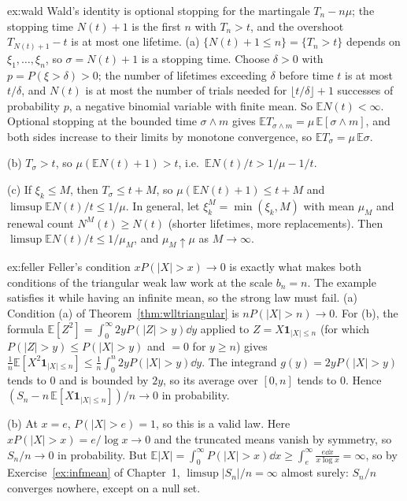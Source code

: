 \begin{solution}{ex:wald}
\idea Wald's identity is optional stopping for the martingale $T_n-n\mu$; the stopping time $N(t)+1$ is the first $n$ with $T_n>t$, and the overshoot
$T_{N(t)+1}-t$ is at most one lifetime.
\writeup (a) $\{N(t)+1\le n\}=\{T_n>t\}$ depends on $\xi_1,\dots,\xi_n$, so $\sigma=N(t)+1$ is a stopping time. Choose $\delta>0$ with $p=P(\xi>\delta)>0$; the
number of lifetimes exceeding $\delta$ before time $t$ is at most $t/\delta$, and $N(t)$ is at most the number of trials needed for $\lfloor t/\delta\rfloor+1$
successes of probability $p$, a negative binomial variable with finite mean. So $\mathbb E N(t)<\infty$. Optional stopping at the bounded time $\sigma\wedge m$ gives
$\mathbb E T_{\sigma\wedge m}=\mu\,\mathbb E[\sigma\wedge m]$, and both sides increase to their limits by monotone convergence, so $\mathbb E T_\sigma=\mu\,\mathbb E\sigma$.

(b) $T_\sigma>t$, so $\mu(\mathbb E N(t)+1)>t$, i.e.\ $\mathbb E N(t)/t>1/\mu-1/t$.

(c) If $\xi_k\le M$, then $T_\sigma\le t+M$, so $\mu(\mathbb E N(t)+1)\le t+M$ and $\limsup\mathbb E N(t)/t\le1/\mu$. In general, let $\xi_k^M=\min(\xi_k,M)$ with mean
$\mu_M$ and renewal count $N^M(t)\ge N(t)$ (shorter lifetimes, more replacements). Then $\limsup\mathbb E N(t)/t\le1/\mu_M$, and $\mu_M\uparrow\mu$ as $M\to\infty$.
\end{solution}

\begin{solution}{ex:feller}
\idea Feller's condition $xP(|X|>x)\to0$ is exactly what makes both conditions of the triangular weak law work at the scale $b_n=n$. The example
satisfies it while having an infinite mean, so the strong law must fail.
\writeup (a) Condition (a) of Theorem~\ref{thm:wlltriangular} is $nP(|X|>n)\to0$. For (b), the formula $\mathbb E[Z^2]=\int_0^\infty2yP(|Z|>y)\dd y$ applied to
$Z=X\mathbf 1_{|X|\le n}$ (for which $P(|Z|>y)\le P(|X|>y)$ and $=0$ for $y\ge n$) gives $\frac1n\mathbb E[X^2\mathbf 1_{|X|\le n}]\le\frac1n\int_0^n2yP(|X|>y)\dd y$.
The integrand $g(y)=2yP(|X|>y)$ tends to $0$ and is bounded by $2y$, so its average over $[0,n]$ tends to $0$. Hence $(S_n-n\,\mathbb E[X\mathbf 1_{|X|\le n}])/n\to0$
in probability.

(b) At $x=e$, $P(|X|>e)=1$, so this is a valid law. Here $xP(|X|>x)=e/\log x\to0$ and the truncated means vanish by symmetry, so $S_n/n\to0$ in probability.
But $\mathbb E|X|=\int_0^\infty P(|X|>x)\dd x\ge\int_e^\infty\frac{e\dd x}{x\log x}=\infty$, so by Exercise~\ref{ex:infmean} of Chapter~1, $\limsup|S_n|/n=\infty$
almost surely: $S_n/n$ converges nowhere, except on a null set.
\end{solution}

